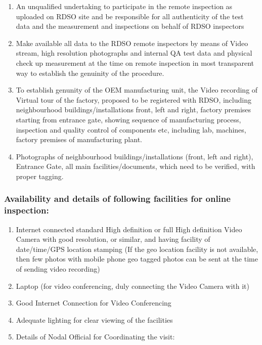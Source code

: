\documentclass[
]{article}
\begin{document}
\begin{enumerate}
\def\labelenumi{\arabic{enumi}.}
\item
  An unqualified undertaking to participate in the remote inspection as
  uploaded on RDSO site and be responsible for all authenticity of the
  test data and the measurement and inspections on behalf of RDSO
  inspectors
\item
  Make available all data to the RDSO remote inspectors by means of
  Video stream, high resolution photographs and internal QA test data
  and physical check up measurement at the time on remote inspection in
  most transparent way to establish the genuinity of the procedure.
\item
  To establish genunity of the OEM manufacturing unit, the Video
  recording of Virtual tour of the factory, proposed to be registered
  with RDSO, including neighbourhood buildings/installations front, left
  and right, factory premises starting from entrance gate, showing
  sequence of manufacturing process, inspection and quality control of
  components etc, including lab, machines, factory premises of
  manufacturing plant.
\item
  Photographs of neighbourhood buildings/installations (front, left and
  right), Entrance Gate, all main facilities/documents, which need to be
  verified, with proper tagging.
\end{enumerate}

\newpage

\hypertarget{availability-and-details-of-following-facilities-for-online-inspection}{%
\subsubsection{Availability and details of following facilities for
online
inspection:}\label{availability-and-details-of-following-facilities-for-online-inspection}}

\begin{enumerate}
\def\labelenumi{\arabic{enumi}.}
\item
  Internet connected standard High definition or full High definition
  Video Camera with good resolution, or similar, and having facility of
  date/time/GPS location stamping (If the geo location facility is not
  available, then few photos with mobile phone geo tagged photos can be
  sent at the time of sending video recording)
\item
  Laptop (for video conferencing, duly connecting the Video Camera with
  it)
\item
  Good Internet Connection for Video Conferencing
\item
  Adequate lighting for clear viewing of the facilities
\item
  Details of Nodal Official for Coordinating the visit:
\end{enumerate}
\end{document}
